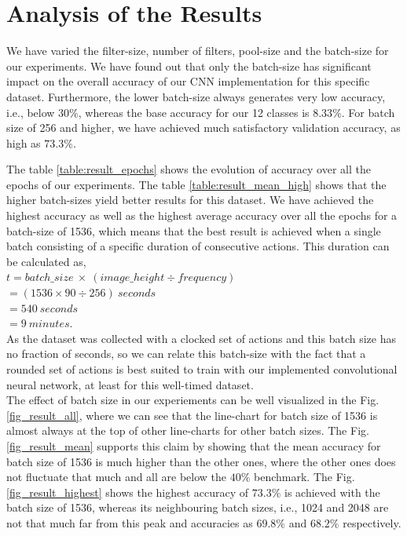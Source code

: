 \documentclass[conference]{IEEEtran}
\begin{document}
\section{Analysis of the Results}
\label{section_results}
We have varied the filter-size, number of filters, pool-size and the batch-size for our experiments. We have found out that only the batch-size has significant impact on the overall accuracy of our CNN implementation for this specific dataset. Furthermore, the lower batch-size always generates very low accuracy, i.e., below $30\%$, whereas the base accuracy for our 12 classes is $8.33\%$. For batch size of 256 and higher, we have achieved much satisfactory validation accuracy, as high as $73.3\%$.

The table \ref{table:result_epochs} shows the evolution of accuracy over all the epochs of our experiments. The table \ref{table:result_mean_high} shows that the higher batch-sizes yield better results for this dataset. We have achieved the highest accuracy as well as the highest average accuracy over all the epochs for a batch-size of 1536, which means that the best result is achieved when a single batch consisting of a specific duration of consecutive actions. This duration can be calculated as, \\
$t = batch\_size\ \times\ (image\_height \div frequency)$\\
$=(1536 \times 90 \div 256)\ seconds$\\
$= 540\ seconds$ \\
$= 9\ minutes.$\\


As the dataset was collected with a clocked set of actions and this batch size has no fraction of seconds, so we can relate this batch-size with the fact that a rounded set of actions is best suited to train with our implemented convolutional neural network, at least for this well-timed dataset.\\
The effect of batch size in our experiements can be well visualized in the Fig. \ref{fig_result_all}, where we can see that the line-chart for batch size of 1536 is almost always at the top of other line-charts for other batch sizes. The Fig. \ref{fig_result_mean} supports this claim by showing that the mean accuracy for batch size of 1536 is much higher than the other ones, where the other ones does not fluctuate that much and all are below the $40\%$ benchmark. The Fig. \ref{fig_result_highest} shows the highest accuracy of $73.3\%$ is achieved with the batch size of 1536, whereas its neighbouring batch sizes, i.e., 1024 and 2048 are not that much far from this peak and accuracies as $69.8\%$ and $68.2\%$ respectively.
\end{document}

